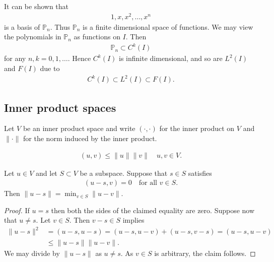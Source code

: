 \documentclass[12pt,oneside]{amsart}
\begin{document}
It can be shown that 
    \begin{align*}
1, x, x^2, \dots, x^n
    \end{align*}
is a basis of $\mathbb P_n$. Thus $\mathbb P_n$ is a finite dimensional space of functions. 
We may view the polynomials in $\mathbb P_n$ as functions on $I$. Then
    \begin{align*}
\mathbb P_n \subset C^k(I)
    \end{align*}
for any $n,k=0,1,\dots$. Hence $C^k(I)$ is infinite dimensional,
and so are $L^2(I)$ and $F(I)$ due to 
    \begin{align*}
C^k(I) \subset L^2(I) \subset F(I).
    \end{align*}

\subsection{Inner product spaces}

Let $V$ be an inner product space and write $(\cdot, \cdot)$ for the inner product on $V$ and $\|\cdot\|$ for the norm induced by the inner product.

\begin{lemma}
    \begin{align*}
(u, v) \le \|u\| \|v\| \quad u,v \in V.
    \end{align*}
\end{lemma}

\begin{lemma}
Let $u \in V$ and let $S \subset V$ be a subspace. Suppose that $s \in S$ satisfies
    \begin{align*}
(u - s, v) = 0 \quad \text{for all $v \in S$}.
    \end{align*}
Then $\| u - s \| = \min_{v \in S} \| u - v \|$.
\end{lemma}
\begin{proof}
If $u = s$ then both the sides of the claimed equality are zero.
Suppose now that $u \ne s$. Let $v \in S$. Then $v -s \in S$ implies
    \begin{align*}
\| u - s \|^2 
&= 
(u - s, u - s) 
= 
(u - s, u - v) + (u - s, v - s)
= 
(u - s, u - v) 
\\&\le 
\| u - s \| \| u - v \|.
    \end{align*}
We may divide by $\| u - s \|$ as $u \ne s$. As $v \in S$ is arbitrary, the claim follows.
\end{proof}
\end{document}
